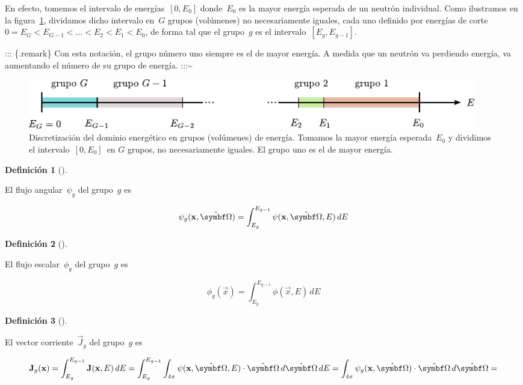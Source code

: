 \documentclass[
  12pt,
  a4paper,
  table]{scrbook}
\theoremstyle{plain}
\theoremstyle{definition}
\newtheorem{definition}{Definición}[chapter]
\theoremstyle{plain}
\theoremstyle{plain}
\theoremstyle{remark}
\begin{document}
En efecto, tomemos el intervalo de energías~\([0,E_0]\) donde~\(E_0\) es
la mayor energía esperada de un neutrón individual. Como ilustramos en
la figura~\ref{fig-multigroup}, dividamos dicho intervalo en~\(G\)
grupos (volúmenes) no necesariamente iguales, cada uno definido por
energías de corte~\(0=E_G < E_{G-1} < \dots < E_2 < E_1 < E_0\), de
forma tal que el grupo~\(g\) es el intervalo~\([E_g,E_{g-1}]\).

::: \{.remark\} Con esta notación, el grupo número uno siempre es el de
mayor energía. A medida que un neutrón va perdiendo energía, va
aumentando el número de su grupo de energía. :::\textasciitilde{}

\begin{figure}

{\centering \includegraphics[width=0.95\textwidth,height=\textheight]{040-discretizacion/multigroup-energy.pdf}

}

\caption{\label{fig-multigroup}Discretización del dominio energético en
grupos (volúmenes) de energía. Tomamos la mayor energía esperada~\(E_0\)
y dividimos el intervalo~\([0,E_0]\)~en \(G\) grupos, no necesariamente
iguales. El grupo uno es el de mayor energía.}

\end{figure}

\begin{definition}[]\protect\hypertarget{def-psig}{}\label{def-psig}

El flujo angular~\(\psi_g\) del grupo~\(g\) es

\[
\psi_g(\vec{x}, \omegaversor) = \int_{E_g}^{E_{g-1}} \psi(\vec{x}, \omegaversor, E) \, dE
\]

\end{definition}

\begin{definition}[]\protect\hypertarget{def-phig}{}\label{def-phig}

El flujo escalar~\(\phi_g\) del grupo~\(g\) es

\[
\phi_g(\vec{x}) = \int_{E_g}^{E_{g-1}} \phi(\vec{x}, E) \, dE
\]

\end{definition}

\begin{definition}[]\protect\hypertarget{def-Jg}{}\label{def-Jg}

El vector corriente~\(\vec{J}_g\) del grupo~\(g\) es

\[
\vec{J}_g(\vec{x}) =
\int_{E_g}^{E_{g-1}} \vec{J}(\vec{x},E) \, dE =
\int_{E_g}^{E_{g-1}} \int_{4\pi} \psi(\vec{x}, \omegaversor, E) \cdot \omegaversor \, d\omegaversor \, dE =
\int_{4\pi} \psi_g(\vec{x}, \omegaversor) \cdot \omegaversor \, d\omegaversor =
\]

\end{definition}
\end{document}
